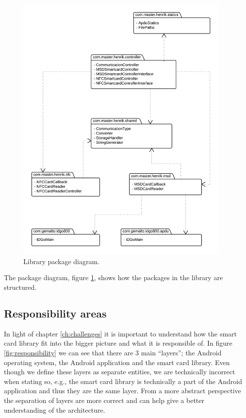 \begin{figure}[h!]
  \captionsetup{justification=centering,margin=1.5cm}
  \caption{Library package diagram.}
  \label{fig:package}
  \centering
    \includegraphics[width=0.95\textwidth]{images/package2.png}
\end{figure}
The package diagram, figure \ref{fig:package}, shows how  the packages in the library are structured.

\subsection{Responsibility areas}
In light of chapter \ref{ch:challenges} it is important to understand how the smart card library fit into the bigger picture and what it is responsible of. In figure \ref{fig:responsibility} we can see that there are 3 main ``layers''; the Android operating system, the Android application and the smart card library. Even though we define these layers as separate entities, we are technically incorrect when stating so, e.g., the smart card library is technically a part of the Android application and thus they are the same layer. From a more abstract perspective the separation of layers are more correct and can help give a better understanding of the architecture.

